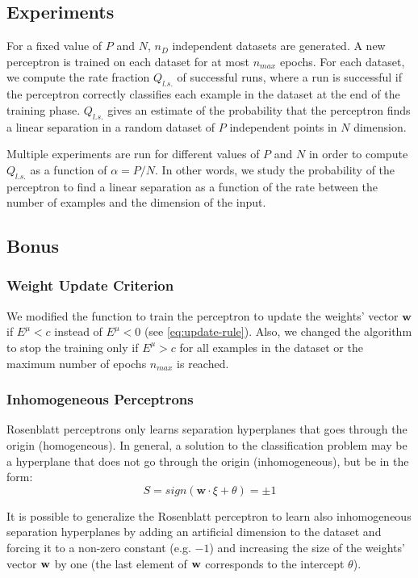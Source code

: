 \subsection{Experiments}
For a fixed value of $P$ and $N$, $n_D$ independent datasets are generated.
A new perceptron is trained on each dataset for at most $n_{max}$ epochs.
For each dataset, we compute the rate fraction $Q_{l.s.}$ of successful runs, where a run is successful if the perceptron correctly classifies each example in the dataset at the end of the training phase.
$Q_{l.s.}$ gives an estimate of the probability that the perceptron finds a linear separation in a random dataset of $P$ independent points in $N$ dimension.

Multiple experiments are run for different values of $P$ and $N$ in order to compute $Q_{l.s.}$ as a function of $\alpha = P / N$.
In other words, we study the probability of the perceptron to find a linear separation as a function of the rate between the number of examples and the dimension of the input.

\subsection{Bonus}
\subsubsection{Weight Update Criterion}
We modified the function to train the perceptron to update the weights' vector $\mathsf{\bm{w}}$ if $E^\mu < c$ instead of $E^\mu < 0$ (see \cref{eq:update-rule}).
Also, we changed the algorithm to stop the training only if $E^{\mu} > c$ for all examples in the dataset or the maximum number of epochs $n_{max}$ is reached.

\subsubsection{Inhomogeneous Perceptrons}
Rosenblatt perceptrons only learns separation hyperplanes that goes through the origin (homogeneous).
In general, a solution to the classification problem may be a hyperplane that does not go through the origin (inhomogeneous), but be in the form:
\begin{equation}
    S = sign(\mathsf{\bm{w}} \cdotp \xi + \theta) = \pm 1
\end{equation}

It is possible to generalize the Rosenblatt perceptron to learn also inhomogeneous separation hyperplanes by adding an artificial dimension to the dataset and forcing it to a non-zero constant (e.g. $-1$) and increasing the size of the weights' vector $\mathsf{\bf{w}}$ by one (the last element of $\mathsf{\bf{w}}$ corresponds to the intercept $\theta$).
